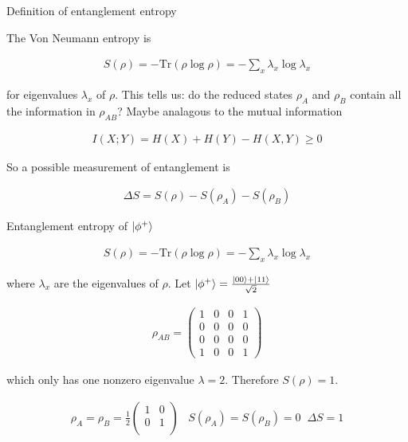 \documentclass[aspectratio=1610]{beamer}					%
\begin{document}
\begin{frame}{Definition of entanglement entropy}

The Von Neumann entropy is

\begin{align*}
S(\rho) = -\mathrm{Tr}(\rho\log\rho) = -\sum_{x}\lambda_{x}\log\lambda_{x}
\end{align*}

for eigenvalues $\lambda_{x}$ of $\rho$. This tells us: do the reduced states $\rho_{A}$ and $\rho_{B}$ contain all the information in $\rho_{AB}$? Maybe analagous to the mutual information

\begin{align*}
I(X;Y) = H(X) + H(Y) - H(X,Y) \geq 0
\end{align*}

So a possible measurement of entanglement is

\begin{align*}
\Delta S = S(\rho) - S(\rho_{A}) - S(\rho_{B})
\end{align*}

\end{frame}

\begin{frame}{Entanglement entropy of $\ket{\phi^{+}}$}

\begin{align*}
S(\rho) = -\mathrm{Tr}(\rho\log\rho) = -\sum_{x}\lambda_{x}\log\lambda_{x}
\end{align*}

where $\lambda_{x}$ are the eigenvalues of $\rho$. Let $\ket{\phi^{+}} = \frac{\ket{00} + \ket{11}}{\sqrt{2}}$

\begin{align*}
\rho_{AB} = 
\begin{pmatrix}
1 & 0 & 0 & 1 \\
0 & 0 & 0 & 0 \\
0 & 0 & 0 & 0 \\
1 & 0 & 0 & 1
\end{pmatrix}
\end{align*}

which only has one nonzero eigenvalue $\lambda = 2$. Therefore $S(\rho) = 1$.

\begin{align*}
\rho_{A} = \rho_{B} = \frac{1}{2}\begin{pmatrix}
1 & 0\\
0 & 1\\
\end{pmatrix}
\;\;\; S(\rho_{A}) = S(\rho_{B}) = 0  \;\; \Delta S = 1
\end{align*}

\end{frame}
\end{document}
